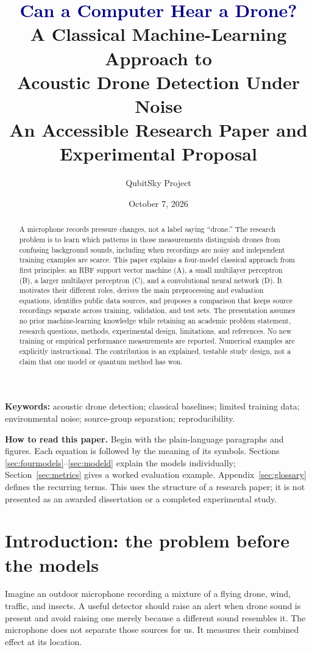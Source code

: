 \documentclass[11pt,letterpaper]{article}
\title{\textcolor{navy}{\textbf{Can a Computer Hear a Drone?}}\\[7pt]
 \Large A Classical Machine-Learning Approach to\\Acoustic Drone Detection Under Noise\\[7pt]
 \large An Accessible Research Paper and Experimental Proposal}
\author{QubitSky Project}
\date{October 7, 2026}
\begin{document}
\maketitle
\thispagestyle{fancy}

\begin{abstract}
A microphone records pressure changes, not a label saying ``drone.'' The
research problem is to learn which patterns in those measurements distinguish
drones from confusing background sounds, including when recordings are noisy
and independent training examples are scarce. This paper explains a four-model
classical approach from first principles: an RBF support vector machine (A),
a small multilayer perceptron (B), a larger multilayer perceptron (C), and a
convolutional neural network (D). It motivates their different roles, derives
the main preprocessing and evaluation equations, identifies public data
sources, and proposes a comparison that keeps source recordings separate across
training, validation, and test sets. The presentation assumes no prior
machine-learning knowledge while retaining an academic problem statement,
research questions, methods, experimental design, limitations, and references.
No new training or empirical performance measurements are reported. Numerical
examples are explicitly instructional. The contribution is an explained,
testable study design, not a claim that one model or quantum method has won.
\end{abstract}

\textbf{Keywords:} acoustic drone detection; classical baselines; limited
training data; environmental noise; source-group separation; reproducibility.

\textbf{How to read this paper.} Begin with the plain-language paragraphs and
figures. Each equation is followed by the meaning of its symbols. Sections
\ref{sec:fourmodels}--\ref{sec:modeld} explain the models individually;
Section~\ref{sec:metrics} gives a worked evaluation example. Appendix~\ref{sec:glossary}
defines the recurring terms. This uses the structure of a research paper; it is
not presented as an awarded dissertation or a completed experimental study.

\section{Introduction: the problem before the models}
\label{sec:intro}
Imagine an outdoor microphone recording a mixture of a flying drone, wind,
traffic, and insects. A useful detector should raise an alert when drone sound
is present and avoid raising one merely because a different sound resembles
it. The microphone does not separate those sources for us. It measures their
combined effect at its location.
\end{document}
